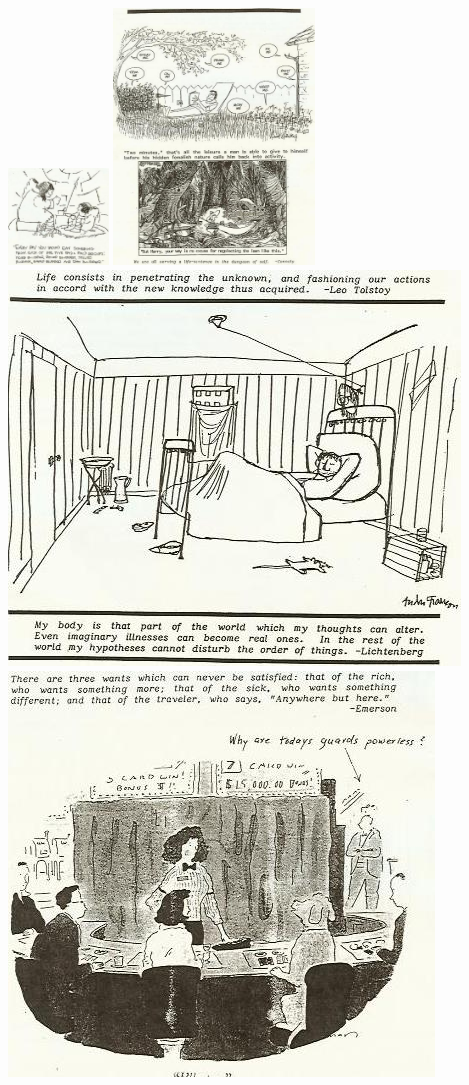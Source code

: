 \documentclass[landscape,twocolumn,letterpaper]{article}
\begin{document}
\clearpage%
\includegraphics[width=0.2\textwidth,bb= 0 0 409 396]{./p27.jpg}
\clearpage%
\includegraphics[width=0.4\textwidth,bb= 0 0 476 608]{./p28.jpg}
\clearpage%
\includegraphics[height=0.325\textheight,bb= 0 0 453 396]{./p29.jpg}
\clearpage%
\includegraphics[height=0.4\textheight,bb= 0 0 427 406]{./p30.jpg}
\end{document}
